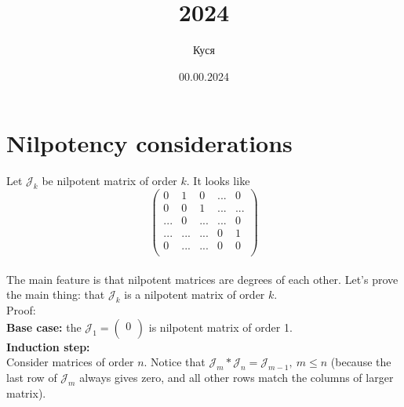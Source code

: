 \documentclass[14pt]{extarticle}
\title{2024}
\author{Куся}
\date{00.00.2024}
\begin{document}
\maketitle
\tableofcontents

\section{Nilpotency considerations}
Let $\mathcal{J}_k$ be nilpotent matrix of order $k$. It looks like
\[\begin{pmatrix}
    0 & 1 & 0 & ... & 0   \\
    0 & 0 & 1 & ... & ... \\
    ... & 0 & ... & ... & 0 \\
    ... & ... & ... & 0 & 1 \\
    0 & ... & ... & 0 & 0   \\
\end{pmatrix}
\] \\
The main feature is that nilpotent matrices are degrees of each other. 
Let's prove the main thing: that
$\mathcal{J}_k$ is a nilpotent matrix of order $k$.
\\
Proof: \\
\textbf{Base case:} the \(\mathcal{J}_1 = \begin{pmatrix}
    0\\
\end{pmatrix}\) is nilpotent matrix of order 1.\\
\textbf{Induction step:}\\
Consider matrices of order $n$. 
Notice that $\mathcal{J}_m * \mathcal{J}_n = \mathcal{J}_{m-1}, \ m \leq n$
(because the last row of $\mathcal{J}_m$ always gives zero, and all 
other rows match the columns of larger matrix). 
\end{document}

